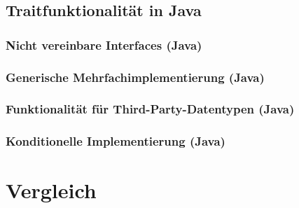 \documentclass[a4paper, 1ppt]{article}
\begin{document}
\subsection{Traitfunktionalität in Java}
\subsubsection{Nicht vereinbare Interfaces (Java)}
\subsubsection{Generische Mehrfachimplementierung (Java)}
\subsubsection{Funktionalität für Third-Party-Datentypen (Java)}
\subsubsection{Konditionelle Implementierung (Java)}
\section{Vergleich}



\end{document}
